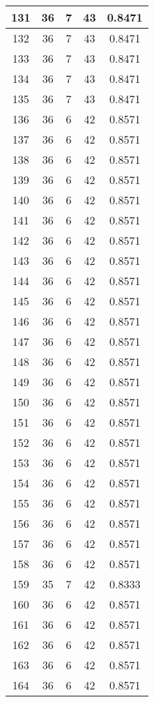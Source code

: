 \documentclass[letterpaper, 12pt]{article}
\begin{document}
\begin{longtable}{|c|c|c|c|c|}
\hline
131 & 36 & 7 & 43 & 0.8471 \\
\hline
132 & 36 & 7 & 43 & 0.8471 \\
\hline
133 & 36 & 7 & 43 & 0.8471 \\
\hline
134 & 36 & 7 & 43 & 0.8471 \\
\hline
135 & 36 & 7 & 43 & 0.8471 \\
\hline
136 & 36 & 6 & 42 & 0.8571 \\
\hline
137 & 36 & 6 & 42 & 0.8571 \\
\hline
138 & 36 & 6 & 42 & 0.8571 \\
\hline
139 & 36 & 6 & 42 & 0.8571 \\
\hline
140 & 36 & 6 & 42 & 0.8571 \\
\hline
141 & 36 & 6 & 42 & 0.8571 \\
\hline
142 & 36 & 6 & 42 & 0.8571 \\
\hline
143 & 36 & 6 & 42 & 0.8571 \\
\hline
144 & 36 & 6 & 42 & 0.8571 \\
\hline
145 & 36 & 6 & 42 & 0.8571 \\
\hline
146 & 36 & 6 & 42 & 0.8571 \\
\hline
147 & 36 & 6 & 42 & 0.8571 \\
\hline
148 & 36 & 6 & 42 & 0.8571 \\
\hline
149 & 36 & 6 & 42 & 0.8571 \\
\hline
150 & 36 & 6 & 42 & 0.8571 \\
\hline
151 & 36 & 6 & 42 & 0.8571 \\
\hline
152 & 36 & 6 & 42 & 0.8571 \\
\hline
153 & 36 & 6 & 42 & 0.8571 \\
\hline
154 & 36 & 6 & 42 & 0.8571 \\
\hline
155 & 36 & 6 & 42 & 0.8571 \\
\hline
156 & 36 & 6 & 42 & 0.8571 \\
\hline
157 & 36 & 6 & 42 & 0.8571 \\
\hline
158 & 36 & 6 & 42 & 0.8571 \\
\hline
159 & 35 & 7 & 42 & 0.8333 \\
\hline
160 & 36 & 6 & 42 & 0.8571 \\
\hline
161 & 36 & 6 & 42 & 0.8571 \\
\hline
162 & 36 & 6 & 42 & 0.8571 \\
\hline
163 & 36 & 6 & 42 & 0.8571 \\
\hline
164 & 36 & 6 & 42 & 0.8571 \\

\end{longtable}
\end{document}
